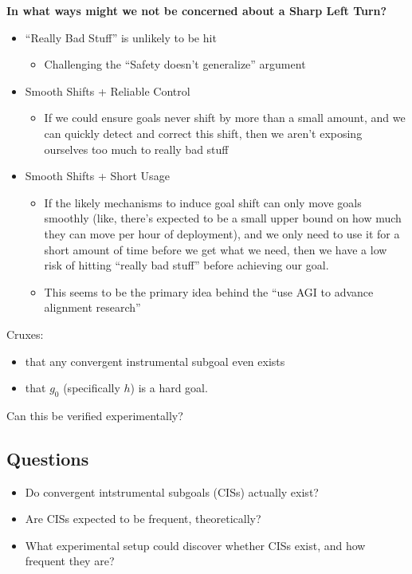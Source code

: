 \documentclass{article}
\begin{document}
\textbf{In what ways might we not be concerned about a Sharp Left Turn?}
\begin{itemize}
    \item “Really Bad Stuff” is unlikely to be hit
    \begin{itemize}
        \item Challenging the “Safety doesn’t generalize” argument
    \end{itemize}
    \item Smooth Shifts + Reliable Control
    \begin{itemize}
        \item If we could ensure goals never shift by more than a small amount, and we can quickly detect and correct this shift, then we aren’t exposing ourselves too much to really bad stuff
    \end{itemize}
    \item Smooth Shifts + Short Usage
    \begin{itemize}
        \item If the likely mechanisms to induce goal shift can only move goals smoothly (like, there’s expected to be a small upper bound on how much they can move per hour of deployment), and we only need to use it for a short amount of time before we get what we need, then we have a low risk of hitting “really bad stuff” before achieving our goal.
        \item This seems to be the primary idea behind the “use AGI to advance alignment research”
    \end{itemize}
\end{itemize}


Cruxes:
\begin{itemize}
    \item that any convergent instrumental subgoal even exists
    \item that $g_0$ (specifically $h$) is a hard goal.
\end{itemize}

Can this be verified experimentally?


\subsection*{Questions}
\begin{itemize}
    \item Do convergent intstrumental subgoals (CISs) actually exist? 
    \item Are CISs expected to be frequent, theoretically?
    \item What experimental setup could discover whether CISs exist, and how frequent they are?
\end{itemize}
\end{document}
